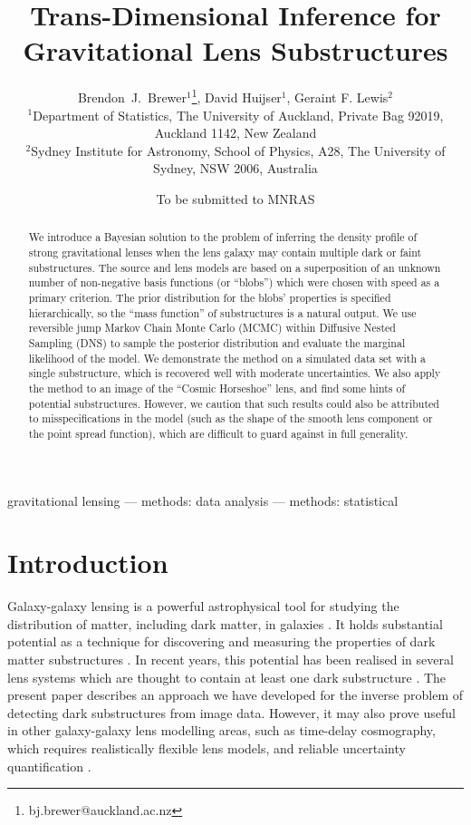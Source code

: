 \documentclass[useAMS,usenatbib]{mn2e}
\title[]
{Trans-Dimensional Inference for Gravitational Lens Substructures}
\author[Brewer, Huijser and Lewis]{%
  Brendon~J.~Brewer$^{1}$\thanks{bj.brewer@auckland.ac.nz},
  David Huijser$^{1}$,
  Geraint F. Lewis$^2$
  \medskip\\
  $^1$Department of Statistics, The University of Auckland, Private Bag 92019, Auckland 1142, New Zealand\\
  $^2$Sydney Institute for Astronomy, School of Physics, A28,
  The University of Sydney, NSW 2006, Australia}
\begin{document}
             
\date{To be submitted to MNRAS}
             
\maketitle

\label{firstpage}

\begin{abstract}
We introduce a Bayesian solution to the problem of inferring the density
profile of strong gravitational lenses when the lens galaxy may contain
multiple dark or faint substructures. The source and lens models are based on
a superposition of an unknown number of non-negative basis functions
(or ``blobs'') which were chosen with speed as a primary criterion.
The prior distribution for the blobs' properties is specified hierarchically,
so the ``mass function'' of substructures is a natural output. We use reversible
jump Markov Chain Monte Carlo (MCMC) within Diffusive Nested Sampling (DNS) to
sample the posterior distribution and evaluate the marginal likelihood of the
model. We demonstrate the method on a simulated data set with a single
substructure, which is recovered well with moderate uncertainties. We also
apply the method to an image of the ``Cosmic Horseshoe'' lens, and find some
hints of potential substructures. However, we caution that such results could
also be attributed to misspecifications in the model (such as the shape of
the smooth lens component or the point spread function),
which are difficult to guard against in full generality.
\end{abstract}


\begin{keywords}
gravitational lensing --- methods: data analysis --- methods: statistical
\end{keywords}

\section{Introduction}
Galaxy-galaxy lensing is a powerful astrophysical tool for studying
the distribution of matter, including dark matter, in galaxies
\citep{treu}. It holds substantial potential as a technique for discovering
and measuring the properties of dark matter substructures \citep{koopmans}.
In recent years, this potential has been realised in several lens systems
which are thought to contain at least one dark substructure
\citep{vegetti1, vegetti2, vegetti3}. The present paper describes an
approach we have developed for the inverse problem of detecting dark
substructures from image data. However, it may also prove useful in other
galaxy-galaxy lens modelling areas, such as time-delay cosmography, which
requires realistically flexible lens models, and reliable uncertainty
quantification
\citep{2013ApJ...766...70S, 2014ApJ...788L..35S, grillo}.
\end{document}
